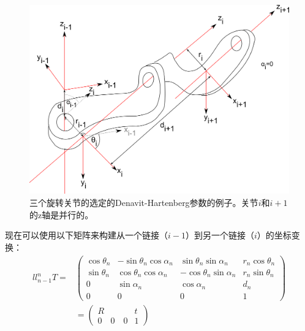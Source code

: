 \begin{figure}
	\centering
		\includegraphics[width=\textwidth]{figs/denavit-hartenberg}
	\caption {三个旋转关节的选定的Denavit-Hartenberg参数的例子。关节$i$和$i+1$的z轴是并行的。}
	\label{fig:denavit}
\end{figure}


现在可以使用以下矩阵来构建从一个链接（$i-1$）到另一个链接（$i$）的坐标变换：
\begin{eqnarray}{ll}
\nonumber
_{n-1}^nT=&
\left(
\begin{array}{ccc|c}
\cos \theta_n & -\sin \theta_n \cos\alpha_n & \sin\theta_n \sin\alpha_n & r_n \cos\theta_n\\
\sin \theta_n & \cos\theta_n \cos\alpha_n & -\cos\theta_n\sin\alpha_n & r_n \sin\theta_n\\
0 & \sin\alpha_n & \cos\alpha_n & d_n\\
\hline
0 & 0 & 0 & 1
\end{array}
\right)\\
&=
\left(
\begin{array}{c|c}
R & t\\
\hline
0 \quad 0 \quad 0 & 1
\end{array}
\right)
\end{eqnarray}

